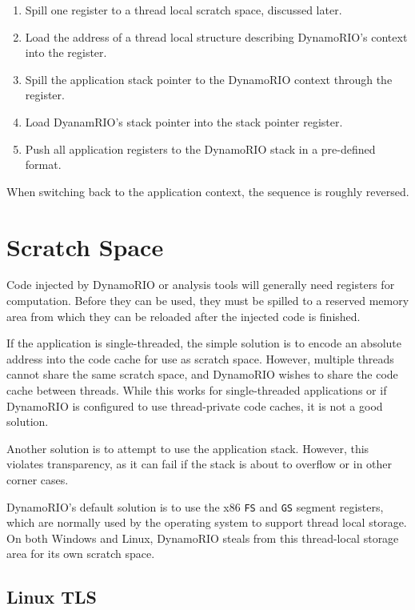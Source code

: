 \begin{enumerate}
\item Spill one register to a thread local scratch space, discussed later.
\item Load the address of a thread local structure describing DynamoRIO's
context into the register.
\item Spill the application stack pointer to the DynamoRIO context through the
register.
\item Load DyanamRIO's stack pointer into the stack pointer register.
\item Push all application registers to the DynamoRIO stack in a pre-defined
format.
\end{enumerate}

When switching back to the application context, the sequence is roughly
reversed.

\section{Scratch Space}


Code injected by DynamoRIO or analysis tools will generally need registers for
computation.  Before they can be used, they must be spilled to a reserved
memory area from which they can be reloaded after the injected code is
finished.

If the application is single-threaded, the simple solution is to encode an
absolute address into the code cache for use as scratch space.  However,
multiple threads cannot share the same scratch space, and DynamoRIO wishes to
share the code cache between threads.  While this works for single-threaded
applications or if DynamoRIO is configured to use thread-private code caches,
it is not a good solution.

Another solution is to attempt to use the application stack.  However, this
violates transparency, as it can fail if the stack is about to overflow or in
other corner cases.

DynamoRIO's default solution is to use the x86 {\tt FS} and {\tt GS} segment
registers, which are normally used by the operating system to support thread
local storage.  On both Windows and Linux, DynamoRIO steals from this
thread-local storage area for its own scratch space.

\subsection{Linux TLS}

